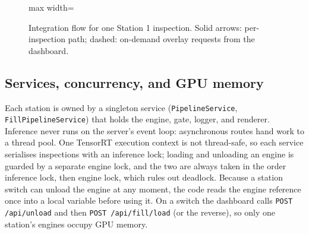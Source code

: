 \begin{figure}[htbp]
\centering
\begin{adjustbox}{max width=\textwidth}
\end{adjustbox}
\caption[Integration flow for one Station 1 inspection]{Integration flow for one Station 1 inspection. Solid arrows: per-inspection path; dashed: on-demand overlay requests from the dashboard.}
\label{fig:integration-flow}
\end{figure}

\subsection{Services, concurrency, and GPU memory}
Each station is owned by a singleton service (\texttt{PipelineService}, \texttt{FillPipelineService}) that holds the engine, gate, logger, and renderer. Inference never runs on the server's event loop: asynchronous routes hand work to a thread pool. One TensorRT execution context is not thread-safe, so each service serialises inspections with an inference lock; loading and unloading an engine is guarded by a separate engine lock, and the two are always taken in the order inference lock, then engine lock, which rules out deadlock. Because a station switch can unload the engine at any moment, the code reads the engine reference once into a local variable before using it. On a switch the dashboard calls \texttt{POST /api/unload} and then \texttt{POST /api/fill/load} (or the reverse), so only one station's engines occupy GPU memory.

